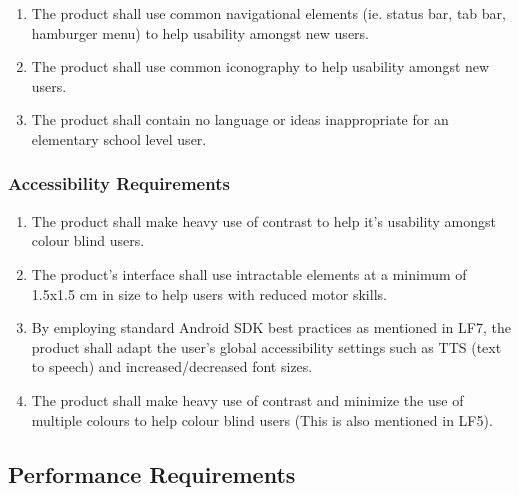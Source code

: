 \documentclass[]{article}
\begin{document}
\begin{enumerate}[{UH}1. ]
 	\resumeEnum
	\item The product shall use common navigational elements (ie. status bar, tab bar, hamburger menu) to help usability amongst new users.
	\item The product shall use common iconography to help usability amongst new users.
	\item The product shall contain no language or ideas inappropriate for an elementary school level user.
	\holdEnum
\end{enumerate}

\subsubsection{Accessibility Requirements}
\label{ssub:accessibility_requirements}
\begin{enumerate}[{UH}1. ]
	\resumeEnum
	\item The product shall make heavy use of contrast to help it's usability amongst colour blind users.
	\item The product's interface shall use intractable elements at a minimum of 1.5x1.5 cm in size to help users with reduced motor skills.
	\item By employing standard Android SDK best practices as mentioned in LF7, the product shall adapt the user's global accessibility settings such as TTS (text to speech) and increased/decreased font sizes.
	\item The product shall make heavy use of contrast and minimize the use of multiple colours to help colour blind users (This is also mentioned in LF5).
\end{enumerate}


\subsection{Performance Requirements}
\label{sub:performance_requirements}
\end{document}
